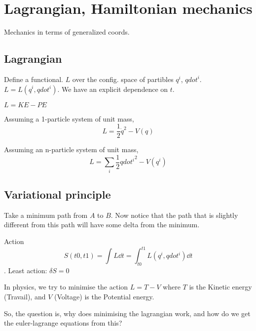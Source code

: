 \newcommand{\qdot}{{\dot q}}

\chapter{Lagrangian, Hamiltonian mechanics}

Mechanics in terms of generalized coords.
\section{Lagrangian}
Define a functional. $L$ over the config. space of partibles $q^i$, $qdot^i$.
$L = L(q^i, qdot^i)$.  We have an explicit dependence on $t$.



$L = KE - PE$

Assuming a 1-particle system of unit mass,
$$L = \frac{1}{2} \qdot^2 - V(q)$$

Assuming an n-particle system of unit mass,
$$L = \sum_i \frac{1}{2} {qdot^i}^2 - V(q^i)$$ 

\section{Variational principle}

Take a minimum path from $A$ to $B$. Now notice that the path that is
slightly different from this path will have some delta from the minimum.

Action
$$S(t0, t1) = \int L \dd t = \int_{t0}^{t1} L(q^i, qdot^i) \dd t$$.
Least action: $\delta S = 0$

In physics, we try to minimise the action $L = T - V$ where $T$ is the
Kinetic energy (Travail), and $V$ (Voltage) is the Potential energy.

So, the question is, why does minimising the lagrangian work,
and how do we get the euler-lagrange equations from this?
